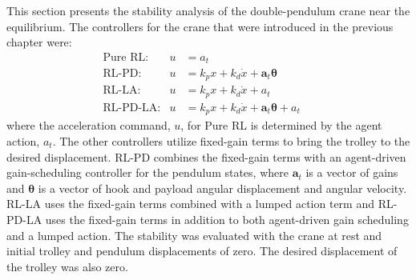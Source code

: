 This section presents the stability analysis of the double-pendulum crane near the equilibrium. The controllers for the crane that were introduced in the previous chapter were:
%
\begin{align*}
  &\qquad\qquad\text{Pure RL:} & u&=a_t \qquad\qquad\qquad\\
  &\qquad\qquad\text{RL-PD:} & u&=k_px+k_d\dot{x} + \boldsymbol{a}_t\boldsymbol{\theta} \qquad\qquad\qquad\\
  &\qquad\qquad\text{RL-LA:} & u&=k_px+k_d\dot{x} + a_t \qquad\qquad\qquad\\
  &\qquad\qquad\text{RL-PD-LA:} & u&=k_px+k_d\dot{x} + \boldsymbol{a}_t\boldsymbol{\theta} + a_t \qquad\qquad\qquad
\end{align*}
%
where the acceleration command, $u$, for Pure RL is determined by the agent action, $a_t$. The other controllers utilize fixed-gain terms to bring the trolley to the desired displacement. RL-PD combines the fixed-gain terms with an agent-driven gain-scheduling controller for the pendulum states, where $\boldsymbol{a}_t$ is a vector of gains and $\boldsymbol{\theta}$ is a vector of hook and payload angular displacement and angular velocity. RL-LA uses the fixed-gain terms combined with a lumped action term and RL-PD-LA uses the fixed-gain terms in addition to both agent-driven gain scheduling and a lumped action. The stability was evaluated with the crane at rest and initial trolley and pendulum displacements of zero. The desired displacement of the trolley was also zero.
%
%

